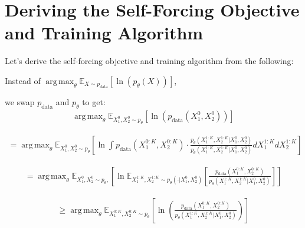 \documentclass[11pt]{article}
\DeclareMathOperator*{\argmax}{arg\,max}
\begin{document}
\begin{center}
\end{center}

\section{Deriving the Self-Forcing Objective and Training Algorithm}

Let's derive the self-forcing objective and training algorithm from the following:

Instead of $\argmax_\theta \mathbb{E}_{X \sim p_{\text{data}}} \left[ \ln(p_\theta(X)) \right]$,

we swap $p_{\text{data}}$ and $p_\theta$ to get:
\begin{align}
\argmax_\theta \mathbb{E}_{X_1^0, X_2^0 \sim p_\theta} \left[ \ln(p_{\text{data}}(X_1^0, X_2^0)) \right]
\end{align}

\begin{align}
= \argmax_\theta \mathbb{E}_{X_1^0, X_2^0 \sim p_\theta} \left[ \ln \int p_{\text{data}}(X_1^{0:K}, X_2^{0:K}) \cdot \frac{p_\theta(X_1^{1:K}, X_2^{1:K} | X_1^0, X_2^0)}{p_\theta(X_1^{1:K}, X_2^{1:K} | X_1^0, X_2^0)} dX_1^{1:K} dX_2^{1:K} \right]
\end{align}

\begin{align}
= \argmax_\theta \mathbb{E}_{X_1^0, X_2^0 \sim p_\theta, } \left[ \ln \mathbb{E}_{X_1^{1:K}, X_2^{1:K} \sim p_\theta(\cdot | X_1^0, X_2^0)} \left[ \frac{p_{\text{data}}(X_1^{0:K}, X_2^{0:K})}{p_\theta(X_1^{1:K}, X_2^{1:K} | X_1^0, X_2^0)} \right] \right]
\end{align}

\begin{align}
\geq \argmax_\theta \mathbb{E}_{X_1^{0:K}, X_2^{0:K} \sim p_\theta} \left[ \ln \left( \frac{p_{\text{data}}(X_1^{0:K}, X_2^{0:K})}{p_\theta(X_1^{1:K}, X_2^{1:K} | X_1^0, X_2^0)} \right) \right]
\end{align}
\end{document}
